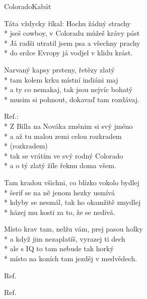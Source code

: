 \documentclass[10.5pt]{book}
\newcommand\tab[1][1cm]{\hspace*{#1}}
\begin{document}
\begin{poem}{Colorado}{Kabát}

\settowidth{\versewidth}{Já radši utratil jsem psa a všechny prachy}

Táta vždycky říkal: Hochu žádný strachy\\*
jseš cowboy, v Coloradu můžeš krávy pást\\*
Já radši utratil jsem psa a všechny prachy\\*
do srdce Evropy já vodjel v klidu krást.

Narvaný kapsy prsteny, řetězy zlatý\\*
tam kolem krku místní indiáni maj\\*
a ty co nemakaj, tak jsou nejvíc bohatý\\*
musim si pohnout, dokavaď tam rozdávaj.

Ref.:\\*
Z Billa na Nováka změnim si svý jméno\\*
a až tu malou zemi celou rozkradem\\*
\tab (rozkradem)\\*
tak se vrátím ve svý rodný Colorado\\*
a o tý zlatý žíle řeknu doma všem.

Tam kradou všichni, co blízko vokolo bydlej\\*
šerif se na ně jenom hezky usmívá\\*
kdyby se nesmál, tak ho okamžitě zmydlej\\*
házej mu kosti za to, že se nedívá.

Místo krav tam, nelžu vám, prej pasou holky\\*
a když jim nezaplatíš, vyrazej ti dech\\*
ale s IQ to tam nebude tak horký\\*
místo na koních tam jezděj v medvědech.

Ref.

Ref.

\end{poem}
\end{document}
